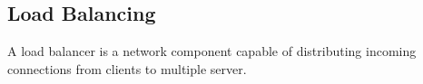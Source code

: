 

\FloatBarrier
\subsection{Load Balancing}
A load balancer is a network component capable of distributing incoming connections from clients to multiple server.

